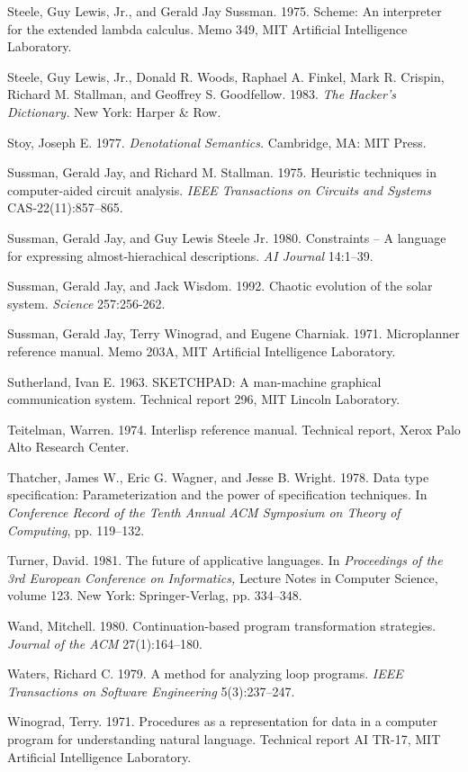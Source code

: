 {Steele, Guy Lewis, Jr., and Gerald Jay Sussman.  1975.  Scheme: An
interpreter for the extended lambda calculus.  Memo 349, MIT
Artificial Intelligence Laboratory.

Steele, Guy Lewis, Jr., Donald R. Woods, Raphael A. Finkel, Mark R.
Crispin, Richard M. Stallman, and Geoffrey S. Goodfellow.  1983.  {\em The Hacker's Dictionary.} New York: Harper \& Row.

Stoy, Joseph E.  1977.  {\em Denotational Semantics.} Cambridge, MA:
MIT Press.

Sussman, Gerald Jay, and Richard M. Stallman.  1975.  Heuristic
techniques in computer-aided circuit analysis.  {\em IEEE Transactions
on Circuits and Systems} CAS-22(11):857--865.

Sussman, Gerald Jay, and Guy Lewis Steele Jr.  1980.  Constraints -- A
language for expressing almost-hierachical descriptions.  {\em AI
Journal} 14:1--39.

Sussman, Gerald Jay, and Jack Wisdom.  1992. Chaotic evolution of the
solar system.  {\em Science} 257:256-262.

Sussman, Gerald Jay, Terry Winograd, and Eugene Charniak.  1971.
Microplanner reference manual.  Memo 203A, MIT Artificial Intelligence
Laboratory.

Sutherland, Ivan E.  1963.  SKETCHPAD: A man-machine graphical
communica\-tion system.  Technical report 296, MIT Lincoln Laboratory.

Teitelman, Warren.  1974.  Interlisp reference manual.  Technical
report, Xerox Palo Alto Research Center.

Thatcher, James W., Eric G. Wagner, and Jesse B. Wright. 1978.
Data type specification: Parameterization and the power of
specification techniques. In {\em Con\-fe\-rence Record of the Tenth Annual ACM
Symposium on Theory of Computing}, pp. 119--132.

Turner, David.  1981.  The future of applicative languages.  In {\em Proceedings of the 3rd European Conference on Informatics,} Lecture
Notes in Computer Science, volume 123. New York: Springer-Verlag, pp.
334--348.

Wand, Mitchell.  1980.  Continuation-based program transformation
stra\-te\-gies.  {\em Jour\-nal of the ACM} 27(1):164--180.

Waters, Richard C.  1979.  A method for analyzing loop programs.  
{\em IEEE Trans\-ac\-tions on Software Engineering} 5(3):237--247.

Winograd, Terry.  1971.  Procedures as a representation for data in a
computer program for understanding natural language.  Technical report
AI TR-17, MIT Artificial Intelligence Laboratory.

}

